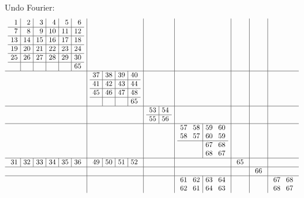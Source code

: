 \documentclass[12pt,a4paper]{amsart}
\begin{document}
\newpage
\noindent
Undo Fourier:
\begin{align*}\arraycolsep4pt
\begin{array}{c|c|c|c|c|c|c}
\begin{array}{r|r|r|r|r|r}%
1&2&3&4&5&6\\\hline%
7&8&9&10&11&12\\\hline%
13&14&15&16&17&18\\\hline%
19&20&21&22&23&24\\\hline%
25&26&27&28&29&30\\\hline%
  &  &  &  &  &65\\%
\end{array}%
&&&&&&
\\\hline
&
\begin{array}{r|r|r|r}%
37&38&39&40\\\hline%
41&42&43&44\\\hline%
45&46&47&48\\\hline%
  &  &  & 65\\%
\end{array}%
&&&&&
\\\hline
&&
\begin{array}{r|r}%
53&54\\\hline%
55&56\\%
\end{array}%
&&&&
\\\hline
&&&
\begin{array}{rr|rr}%
57&58&59&60\\%
58&57&60&59\\\hline%
  &  &67&68\\%
  &  &68&67\\%
\end{array}%
&&&
\\\hline
\begin{array}{r|r|r|r|r|r}%
31&32&33&34&35&36\\%
\end{array}%
&
\begin{array}{r|r|r|r}%
49&50&51&52\\%
\end{array}%
&&&
\begin{array}{r}%
 65\\%
\end{array}%
&&
\\\hline
&&&&&
\begin{array}{r}%
66\\%
\end{array}%
&
\\\hline
&&&
\begin{array}{rr|rr}%
61&62&63&64\\%
62&61&64&63\\%
\end{array}%
&&&
\begin{array}{rr}%
67&68\\%
68&67\\%
\end{array}%
\end{array}
\end{align*}
\end{document}

